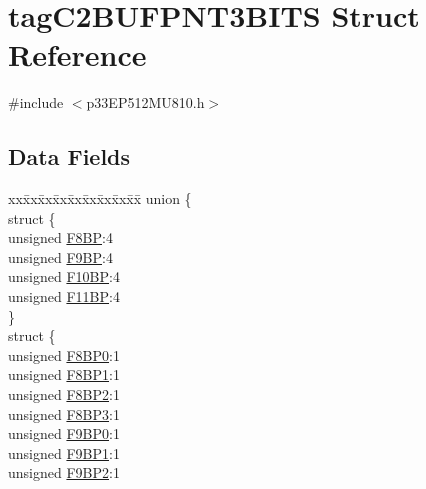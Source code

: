 \hypertarget{structtag_c2_b_u_f_p_n_t3_b_i_t_s}{}\section{tag\+C2\+B\+U\+F\+P\+N\+T3\+B\+I\+TS Struct Reference}
\label{structtag_c2_b_u_f_p_n_t3_b_i_t_s}


{\ttfamily \#include $<$p33\+E\+P512\+M\+U810.\+h$>$}

\subsection*{Data Fields}
\begin{DoxyCompactItemize}
\item 
\begin{tabbing}
xx\=xx\=xx\=xx\=xx\=xx\=xx\=xx\=xx\=\kill
union \{\\
\>struct \{\\
\>\>unsigned \hyperlink{structtag_c2_b_u_f_p_n_t3_b_i_t_s_af4086cb1b890f03da4e717ef304e2540}{F8BP}:4\\
\>\>unsigned \hyperlink{structtag_c2_b_u_f_p_n_t3_b_i_t_s_a64bb36c91a03bc2da73f3aa0c797f219}{F9BP}:4\\
\>\>unsigned \hyperlink{structtag_c2_b_u_f_p_n_t3_b_i_t_s_a8bdc64f4989f9853a8ea76af62a101ad}{F10BP}:4\\
\>\>unsigned \hyperlink{structtag_c2_b_u_f_p_n_t3_b_i_t_s_a583229d93c200f27fcff75a594acbf7f}{F11BP}:4\\
\>\} \\
\>struct \{\\
\>\>unsigned \hyperlink{structtag_c2_b_u_f_p_n_t3_b_i_t_s_a5cdccefe53f6f81f663620e6c072cc4c}{F8BP0}:1\\
\>\>unsigned \hyperlink{structtag_c2_b_u_f_p_n_t3_b_i_t_s_a3b299850601bca0f0498a83ac5e03d7e}{F8BP1}:1\\
\>\>unsigned \hyperlink{structtag_c2_b_u_f_p_n_t3_b_i_t_s_a461d5984d098d6c8d0de00e5d34232b2}{F8BP2}:1\\
\>\>unsigned \hyperlink{structtag_c2_b_u_f_p_n_t3_b_i_t_s_aa89d0c341c2e691b6f729f79add89f92}{F8BP3}:1\\
\>\>unsigned \hyperlink{structtag_c2_b_u_f_p_n_t3_b_i_t_s_a3aabcc4b7c6da5a6b42d053651d680de}{F9BP0}:1\\
\>\>unsigned \hyperlink{structtag_c2_b_u_f_p_n_t3_b_i_t_s_aaff95f6b27c6f5c574a3a63e9b29bacc}{F9BP1}:1\\
\>\>unsigned \hyperlink{structtag_c2_b_u_f_p_n_t3_b_i_t_s_a5c10af0ab5f0f9eb1e07746455e5987b}{F9BP2}:1\\

\end{tabbing}
\end{DoxyCompactItemize}
